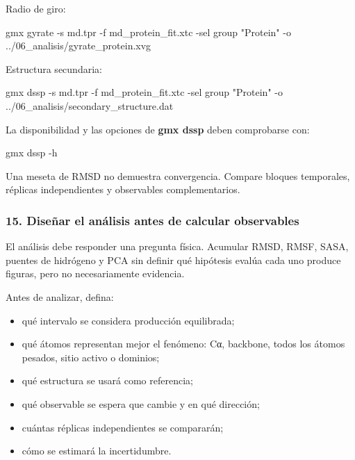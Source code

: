 \documentclass[
  spanish,
  11pt,
  a4paper]{article}
\newenvironment{Shaded}{\begin{snugshade}}{\end{snugshade}}
\newcommand{\AttributeTok}[1]{\textcolor[rgb]{0.13,0.29,0.53}{#1}}
\newcommand{\ExtensionTok}[1]{#1}
\newcommand{\NormalTok}[1]{#1}
\newcommand{\StringTok}[1]{\textcolor[rgb]{0.31,0.60,0.02}{#1}}
\providecommand{\tightlist}{%
  \setlength{\itemsep}{0pt}\setlength{\parskip}{0pt}}
\begin{document}
Radio de giro:

\begin{Shaded}
\begin{Highlighting}[]
\ExtensionTok{gmx}\NormalTok{ gyrate     }\AttributeTok{{-}s}\NormalTok{ md.tpr     }\AttributeTok{{-}f}\NormalTok{ md\_protein\_fit.xtc     }\AttributeTok{{-}sel} \StringTok{\textquotesingle{}group "Protein"\textquotesingle{}}     \AttributeTok{{-}o}\NormalTok{ ../06\_analisis/gyrate\_protein.xvg}
\end{Highlighting}
\end{Shaded}

Estructura secundaria:

\begin{Shaded}
\begin{Highlighting}[]
\ExtensionTok{gmx}\NormalTok{ dssp     }\AttributeTok{{-}s}\NormalTok{ md.tpr     }\AttributeTok{{-}f}\NormalTok{ md\_protein\_fit.xtc     }\AttributeTok{{-}sel} \StringTok{\textquotesingle{}group "Protein"\textquotesingle{}}     \AttributeTok{{-}o}\NormalTok{ ../06\_analisis/secondary\_structure.dat}
\end{Highlighting}
\end{Shaded}

La disponibilidad y las opciones de \textbf{gmx dssp} deben comprobarse
con:

\begin{Shaded}
\begin{Highlighting}[]
\ExtensionTok{gmx}\NormalTok{ dssp }\AttributeTok{{-}h}
\end{Highlighting}
\end{Shaded}

Una meseta de RMSD no demuestra convergencia. Compare bloques
temporales, réplicas independientes y observables complementarios.

\subsubsection{15. Diseñar el análisis antes de calcular
observables}\label{diseuxf1ar-el-anuxe1lisis-antes-de-calcular-observables}

El análisis debe responder una pregunta física. Acumular RMSD, RMSF,
SASA, puentes de hidrógeno y PCA sin definir qué hipótesis evalúa cada
uno produce figuras, pero no necesariamente evidencia.

Antes de analizar, defina:

\begin{itemize}
\tightlist
\item
  qué intervalo se considera producción equilibrada;
\item
  qué átomos representan mejor el fenómeno: Cα, backbone, todos los
  átomos pesados, sitio activo o dominios;
\item
  qué estructura se usará como referencia;
\item
  qué observable se espera que cambie y en qué dirección;
\item
  cuántas réplicas independientes se compararán;
\item
  cómo se estimará la incertidumbre.
\end{itemize}
\end{document}
